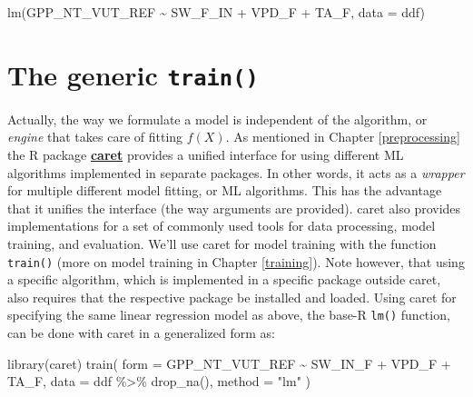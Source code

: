 \documentclass[
]{book}
\newenvironment{Shaded}{\begin{snugshade}}{\end{snugshade}}
\newcommand{\AttributeTok}[1]{\textcolor[rgb]{0.77,0.63,0.00}{#1}}
\newcommand{\FunctionTok}[1]{\textcolor[rgb]{0.00,0.00,0.00}{#1}}
\newcommand{\NormalTok}[1]{#1}
\newcommand{\SpecialCharTok}[1]{\textcolor[rgb]{0.00,0.00,0.00}{#1}}
\newcommand{\StringTok}[1]{\textcolor[rgb]{0.31,0.60,0.02}{#1}}
\begin{document}
\begin{Shaded}
\begin{Highlighting}[]
\FunctionTok{lm}\NormalTok{(GPP\_NT\_VUT\_REF }\SpecialCharTok{\textasciitilde{}}\NormalTok{ SW\_F\_IN }\SpecialCharTok{+}\NormalTok{ VPD\_F }\SpecialCharTok{+}\NormalTok{ TA\_F, }\AttributeTok{data =}\NormalTok{ ddf)}
\end{Highlighting}
\end{Shaded}

\hypertarget{the-generic-train}{%
\section{\texorpdfstring{The generic \texttt{train()}}{The generic train()}}\label{the-generic-train}}

Actually, the way we formulate a model is independent of the algorithm, or \emph{engine} that takes care of fitting \(f(X)\). As mentioned in Chapter \ref{preprocessing} the R package \href{https://topepo.github.io/caret/}{\textbf{caret}} provides a unified interface for using different ML algorithms implemented in separate packages. In other words, it acts as a \emph{wrapper} for multiple different model fitting, or ML algorithms. This has the advantage that it unifies the interface (the way arguments are provided). caret also provides implementations for a set of commonly used tools for data processing, model training, and evaluation. We'll use caret for model training with the function \texttt{train()} (more on model training in Chapter \ref{training}). Note however, that using a specific algorithm, which is implemented in a specific package outside caret, also requires that the respective package be installed and loaded. Using caret for specifying the same linear regression model as above, the base-R \texttt{lm()} function, can be done with caret in a generalized form as:

\begin{Shaded}
\begin{Highlighting}[]
\FunctionTok{library}\NormalTok{(caret)}
\FunctionTok{train}\NormalTok{(}
  \AttributeTok{form =}\NormalTok{ GPP\_NT\_VUT\_REF }\SpecialCharTok{\textasciitilde{}}\NormalTok{ SW\_IN\_F }\SpecialCharTok{+}\NormalTok{ VPD\_F }\SpecialCharTok{+}\NormalTok{ TA\_F, }
  \AttributeTok{data =}\NormalTok{ ddf }\SpecialCharTok{\%\textgreater{}\%} \FunctionTok{drop\_na}\NormalTok{(), }
  \AttributeTok{method =} \StringTok{"lm"}
\NormalTok{)}
\end{Highlighting}
\end{Shaded}
\end{document}

